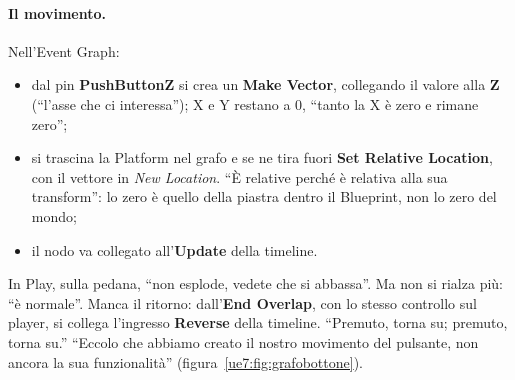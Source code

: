 \paragraph{Il movimento.} Nell'Event Graph:
\begin{itemize}
  \item dal pin \textbf{PushButtonZ} si crea un \textbf{Make Vector}, collegando il
        valore alla \textbf{Z} (``l'asse che ci interessa''); X e Y restano a 0, ``tanto
        la X è zero e rimane zero'';
  \item si trascina la Platform nel grafo e se ne tira fuori \textbf{Set Relative
        Location}, con il vettore in \emph{New Location}. ``È relative perché è
        relativa alla sua transform'': lo zero è quello della piastra dentro il
        Blueprint, non lo zero del mondo;
  \item il nodo va collegato all'\textbf{Update} della timeline.
\end{itemize}
In Play, sulla pedana, ``non esplode, vedete che si abbassa''. Ma non si rialza più:
``è normale''. Manca il ritorno: dall'\textbf{End Overlap}, con lo stesso controllo sul
player, si collega l'ingresso \textbf{Reverse} della timeline. ``Premuto, torna su;
premuto, torna su.'' ``Eccolo che abbiamo creato il nostro movimento del pulsante, non
ancora la sua funzionalità'' (figura~\ref{ue7:fig:grafobottone}).

